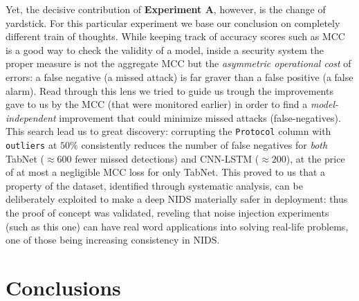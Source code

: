 \documentclass[a4paper, 9pt]{extarticle}
\begin{document}
Yet, the decisive contribution of \textbf{Experiment A}, however, is the change of yardstick.
For this particular experiment we base our conclusion on completely different train of thoughts. While keeping track of accuracy scores such as MCC is a good way to check the validity of a model, inside a security system the proper measure is not the aggregate MCC but the \emph{asymmetric operational cost} of errors: a false negative (a missed attack) is far graver than a false positive (a false alarm). Read through this lens we tried to guide us trough the improvements gave to us by the MCC (that were monitored earlier) in order to find a \emph{model-independent} improvement that could minimize missed attacks (false-negatives). This search lead us to great discovery: corrupting the \texttt{Protocol} column with \texttt{outliers} at $50\%$ consistently reduces the number of false negatives for \emph{both} TabNet ($\approx 600$ fewer missed detections) and CNN-LSTM ($\approx 200$), at the price of at most a negligible MCC loss for only TabNet. This proved to us that a property of the dataset, identified through systematic analysis, can be deliberately exploited to make a deep NIDS materially safer in deployment: thus the proof of concept was validated, reveling that noise injection experiments (such as this one) can have real word applications into solving real-life problems, one of those being increasing consistency in NIDS.

\section{Conclusions}
\end{document}

